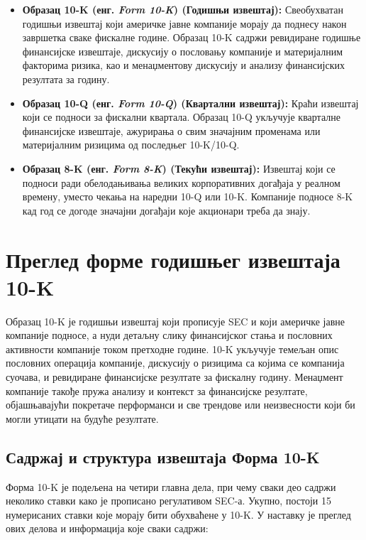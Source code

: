 \begin{itemize}
\item \textbf{Образац 10-K (енг. \textit{Form 10-K}) (Годишњи извештај):} Свеобухватан годишњи извештај који америчке јавне компаније морају да поднесу након завршетка сваке фискалне године. Образац 10-K садржи ревидиране годишње финансијске извештаје, дискусију о пословању компаније и материјалним факторима ризика, као и менаџментову дискусију и анализу финансијских резултата за годину.

\item \textbf{Образац 10-Q (енг. \textit{Form 10-Q}) (Квартални извештај):} Краћи извештај који се подноси за фискални квартала. Образац 10-Q укључује кварталне финансијске извештаје, ажурирања о свим значајним променама или материјалним ризицима од последњег 10-K/10-Q.

\item \textbf{Образац 8-K (енг. \textit{Form 8-K}) (Текући извештај):} Извештај који се подноси ради обелодањивања великих корпоративних догађаја у реалном времену, уместо чекања на наредни 10-Q или 10-K. Компаније подносе 8-K кад год се догоде значајни догађаји које акционари треба да знају.
\end{itemize}

\section{Преглед форме годишњег извештаја 10-K}

Образац 10-K је годишњи извештај који прописује SEC и који америчке јавне компаније подносе, а нуди детаљну слику финансијског стања и пословних активности компаније током претходне године. 10-K укључује темељан опис пословних операција компаније, дискусију о ризицима са којима се компанија суочава, и ревидиране финансијске резултате за фискалну годину. Менаџмент компаније такође пружа анализу и контекст за финансијске резултате, објашњавајући покретаче перформанси и све трендове или неизвесности који би могли утицати на будуће резултате.

\subsection{Садржај и структура извештаја Форма 10-K}

Форма 10-K је подељена на четири главна дела, при чему сваки део садржи неколико ставки како је прописано регулативом SEC-а. Укупно, постоји 15 нумерисаних ставки које морају бити обухваћене у 10-K. У наставку је преглед ових делова и информација које сваки садржи:


